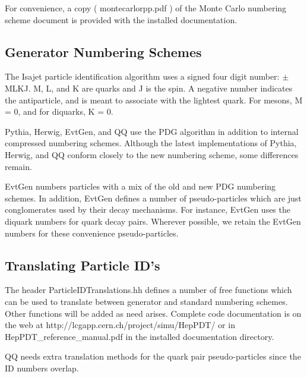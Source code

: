 For convenience, a copy ( montecarlorpp.pdf ) of the Monte Carlo numbering 
scheme document is provided with the installed documentation.

\subsection { Generator Numbering Schemes }

The Isajet particle identification algorithm uses a signed four digit
number: $\pm$MLKJ.  M, L, and K are quarks and J is the spin.  A negative
number indicates the antiparticle, and is meant to associate with the
lightest quark.  For mesons, M = 0, and for diquarks, K = 0.

Pythia, Herwig, EvtGen, and QQ use the PDG algorithm in addition to internal
compressed numbering schemes.
Although the latest implementations of Pythia, Herwig, and QQ conform closely
to the new numbering scheme, some differences remain.

EvtGen numbers particles with a mix of the old and new PDG numbering schemes.
In addition, EvtGen defines a number of pseudo-particles which are just 
conglomerates used by their decay mechanisms.  For instance, EvtGen uses the 
diquark numbers for quark decay pairs.  Wherever possible, we retain the 
EvtGen numbers for these convenience pseudo-particles.

\subsection { Translating Particle ID's }

The header ParticleIDTranslations.hh defines a number of free functions 
which can be used to translate between generator and standard numbering schemes.
Other functions will be added as need arises.  
Complete code documentation is
on the web at http://lcgapp.cern.ch/project/simu/HepPDT/
or in HepPDT\_reference\_manual.pdf in the installed documentation directory. 

QQ needs extra translation methods for the 
quark pair pseudo-particles since the ID numbers overlap.

